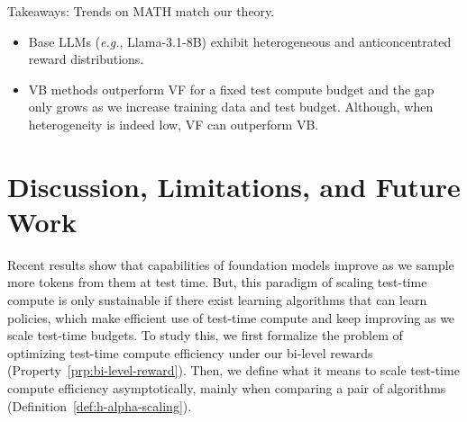 \begin{AIbox}{Takeaways: Trends on MATH match our theory.}
\begin{itemize}[leftmargin=0em]
    \item Base LLMs (\textit{e.g.}, Llama-3.1-8B) exhibit heterogeneous and anticoncentrated reward distributions.
    \item VB methods outperform VF for a fixed test compute budget and the gap only grows as we increase training data and test budget. Although, when heterogeneity is indeed low, VF can outperform VB.
\end{itemize}
\end{AIbox}



\vspace{-0.2cm}
\section{Discussion, Limitations, and Future Work}
\vspace{-0.15cm}

Recent results show that capabilities of foundation models improve as we sample more tokens from them at test time. But, this paradigm of scaling test-time compute is only sustainable if there exist learning algorithms that can learn policies, which make efficient use of test-time compute and keep improving as we scale test-time budgets. To study this, we first formalize the problem of optimizing test-time compute efficiency under our bi-level rewards (Property~\ref{prp:bi-level-reward}). Then, we define what it means to scale test-time compute efficiency asymptotically, mainly when comparing a pair of algorithms (Definition~\ref{def:h-alpha-scaling}).  

